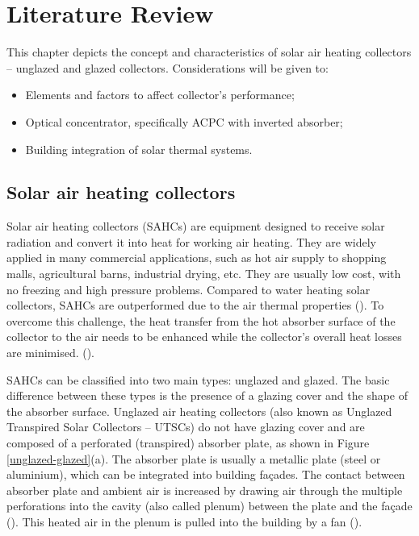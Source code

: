 \chapter{Literature Review}
\label{Cap:Lit}
%

This chapter depicts the concept and characteristics of solar air heating collectors -- unglazed and glazed collectors. Considerations will be given to:

\begin{itemize}
	\item Elements and factors to affect collector's performance;
	\item Optical concentrator, specifically ACPC with inverted absorber;
	\item Building integration of solar thermal systems.
\end{itemize}


\section{Solar air heating collectors}

Solar air heating collectors (SAHCs) are equipment designed to receive solar radiation and convert it into heat for working air heating. They are widely applied in  many commercial applications, such as hot air supply to shopping malls, agricultural barns, industrial drying, etc. They are usually low cost, with no freezing and high pressure problems. Compared to water heating solar collectors, SAHCs are outperformed due to the air thermal properties (\cite{Buker2015}). To overcome this challenge, the heat transfer from the hot absorber surface of the collector to the air needs to be enhanced while the collector's overall heat losses are minimised. (\cite{Shams2013}).

SAHCs can be classified into two main types: unglazed and glazed. The basic difference between these types is the presence of a glazing cover and the shape of the absorber surface. Unglazed air heating collectors (also known as Unglazed Transpired Solar Collectors -- UTSCs) do not have glazing cover and are composed of a perforated (transpired) absorber plate, as shown in Figure \ref{unglazed-glazed}(a). The absorber plate is usually a metallic plate (steel or aluminium), which can be integrated into building fa{\c c}ades. The contact between absorber plate and ambient air is increased by drawing air through the multiple perforations into the cavity (also called plenum) between the plate and the fa{\c c}ade (\cite{Shukla2012}). This heated air in the plenum is pulled into the building by a fan (\cite{Buker2015}).

